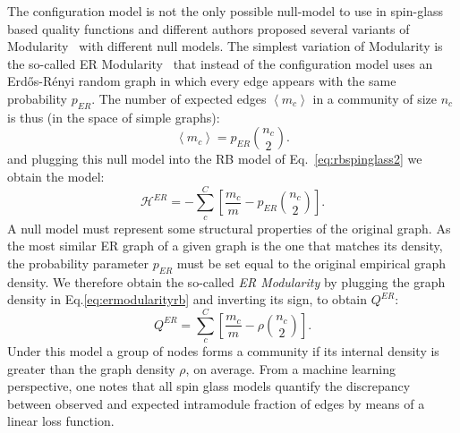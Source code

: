 The configuration model is not the only possible null-model to use in spin-glass based quality functions and different authors proposed several variants of Modularity~\cite{ronhovde2010,ronhovde2009,traag2011} with different null models.
The simplest variation of Modularity is the so-called ER Modularity~\cite{traag2015} that instead of the configuration model uses an Erd\H{o}s-Rényi random graph in which every edge appears with the same probability $p_{ER}$. The number of expected edges $\left< m_c \right>$ in a community of size $n_c$ is thus (in the space of simple graphs):
\begin{equation}
\left< m_c \right> = p_{ER}\binom{n_c}{2}.
\end{equation}
and plugging this null model into the RB model of Eq.~\ref{eq:rbspinglass2} we obtain the model:
\begin{equation}\label{eq:ermodularityrb}
\mathcal{H}^{ER} = -\sum \limits_c^C \left[\frac{m_c}{m}  - p_{ER}\binom{n_c}{2} \right].
\end{equation}
A null model must represent some structural properties of the original graph. As the most similar ER graph of a given graph is the one that matches its density, the probability parameter $p_{ER}$ must be set equal to the original empirical graph density. We therefore obtain the so-called \emph{ER Modularity} by plugging the graph density in Eq.\ref{eq:ermodularityrb} and inverting its sign, to obtain $Q^{ER}$: 
\begin{equation}
Q^{ER} = \sum \limits_c^C \left[\frac{m_c}{m}  - \rho \binom{n_c}{2} \right].
\end{equation}
Under this model a group of nodes forms a community if its internal density is greater than the graph density $\rho$, on average.
From a machine learning perspective, one notes that all spin glass models quantify the discrepancy between observed and expected intramodule fraction of edges by means of a linear loss function.



